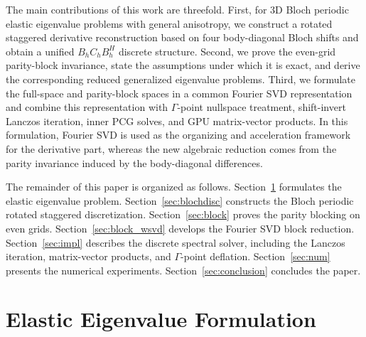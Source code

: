 \documentclass[11pt,oneside]{article}
\numberwithin{equation}{section}
\theoremstyle{plain}
\theoremstyle{remark}
\begin{document}
The main contributions of this work are threefold. First, for 3D Bloch periodic elastic eigenvalue problems with general anisotropy, we construct a rotated staggered derivative reconstruction based on four body-diagonal Bloch shifts and obtain a unified \(B_hC_hB_h^H\) discrete structure. Second, we prove the even-grid parity-block invariance, state the assumptions under which it is exact, and derive the corresponding reduced generalized eigenvalue problems. Third, we formulate the full-space and parity-block spaces in a common Fourier SVD representation and combine this representation with \(\Gamma\)-point nullspace treatment, shift-invert Lanczos iteration, inner PCG solves, and GPU matrix-vector products. In this formulation, Fourier SVD is used as the organizing and acceleration framework for the derivative part, whereas the new algebraic reduction comes from the parity invariance induced by the body-diagonal differences.

The remainder of this paper is organized as follows. Section~\ref{sec:form} formulates the elastic eigenvalue problem. Section~\ref{sec:blochdisc} constructs the Bloch periodic rotated staggered discretization. Section~\ref{sec:block} proves the parity blocking on even grids. Section~\ref{sec:block_wsvd} develops the Fourier SVD block reduction. Section~\ref{sec:impl} describes the discrete spectral solver, including the Lanczos iteration, matrix-vector products, and \(\Gamma\)-point deflation. Section~\ref{sec:num} presents the numerical experiments. Section~\ref{sec:conclusion} concludes the paper.

\section{Elastic Eigenvalue Formulation}
\label{sec:form}
\end{document}
